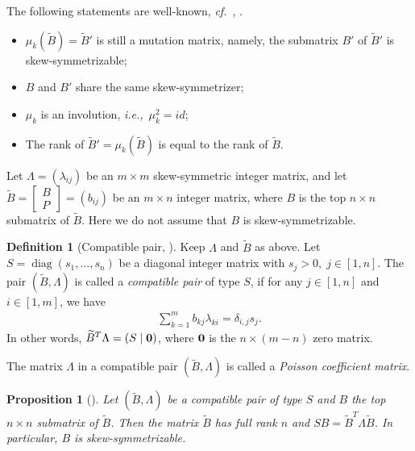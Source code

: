 \documentclass[12pt]{amsart}
\newtheorem{proposition}[theorem]{Proposition}
\theoremstyle{definition}
\newtheorem{definition}[theorem]{Definition}
\theoremstyle{remark}
\numberwithin{equation}{section}
\newcommand{\ie}{\textit{i.e.,}\ }
\newcommand{\confer}{\textit{cf.}\ }
\newcommand{\diag}{\operatorname{diag}}
\begin{document}
The following statements are well-known,  \confer\cite[Proposition 4.5]{fz_2002}, \cite[Lemma 3.2]{bfz_2005}.
\begin{itemize}
    \item $\mu_k(\widetilde B)=\widetilde B'$ is still a mutation matrix, namely, the submatrix $B'$ of $\widetilde B'$ is skew-symmetrizable;
    \item $B$ and $B'$ share the same skew-symmetrizer;
    \item $\mu_k$ is an involution,  \ie $\mu_k^2=id$;
    \item The rank of $ \widetilde B'=\mu_k(\widetilde B)$ is equal to the rank of $\widetilde B$.
\end{itemize}




 Let $\Lambda=(\lambda_{ij})$ be an $m\times m$ skew-symmetric integer matrix, and let
$\widetilde B=\begin{bmatrix}
       B\\ P
   \end{bmatrix}=(b_{ij})$ be
 an $m\times n$ integer matrix, where $B$ is the top $n\times n$ submatrix of $\widetilde B$.  Here we do not assume that $B$ is skew-symmetrizable.



\begin{definition}[Compatible pair, \cite{bz-2005}]
   Keep $\Lambda$ and $\widetilde B$ as above. Let $S=\diag(s_1,\ldots,s_n)$ be a diagonal integer matrix with $s_j>0,\;j\in[1,n]$. The pair $(\widetilde B,\Lambda)$ is called a {\em compatible pair} of type $S$, if for any $j\in[1,n]$ and $i\in[1,m]$, we have
   \begin{eqnarray}\label{eqn:lpair}
    \sum_{k=1}^mb_{kj}\lambda_{ki}=\delta_{i,j}s_j.
   \end{eqnarray}
 In other words,  $\widetilde B^T\Lambda=(S\mid {\bf 0})$, where  ${\bf 0}$ is the $n\times (m-n)$ zero matrix.
\end{definition}

The matrix $\Lambda$ in a compatible pair $(\widetilde B,\Lambda)$ is called a {\em Poisson coefficient matrix}.

 


\begin{proposition}[{\cite[Proposition 3.3]{bz-2005}}]
\label{pro:fullrank}
Let $(\widetilde B,\Lambda)$ be a compatible pair of type $S$ and $B$ the top $n\times n$ submatrix of $\widetilde B$. Then the matrix $\widetilde B$ has full rank $n$ and $SB=\widetilde B^T\Lambda \widetilde B$. In particular,  $B$  is skew-symmetrizable.
\end{proposition}
\end{document}
